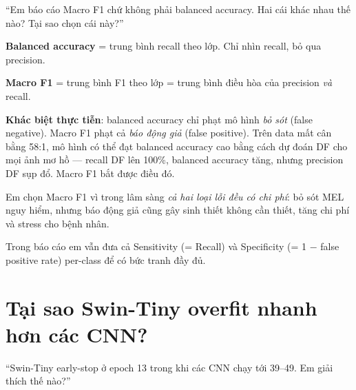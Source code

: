 \documentclass[11pt,a4paper]{article}
\begin{document}
\begin{question}
``Em báo cáo Macro F1 chứ không phải balanced accuracy. Hai cái khác nhau thế nào? Tại sao chọn cái này?''
\end{question}

\begin{answer}
\textbf{Balanced accuracy} = trung bình recall theo lớp. Chỉ nhìn recall, bỏ qua precision.

\textbf{Macro F1} = trung bình F1 theo lớp = trung bình điều hòa của precision \textit{và} recall.

\textbf{Khác biệt thực tiễn}: balanced accuracy chỉ phạt mô hình \textit{bỏ sót} (false negative). Macro F1 phạt cả \textit{báo động giả} (false positive). Trên data mất cân bằng 58:1, mô hình có thể đạt balanced accuracy cao bằng cách dự đoán DF cho mọi ảnh mơ hồ --- recall DF lên 100\%, balanced accuracy tăng, nhưng precision DF sụp đổ. Macro F1 bắt được điều đó.

Em chọn Macro F1 vì trong lâm sàng \textit{cả hai loại lỗi đều có chi phí}: bỏ sót MEL nguy hiểm, nhưng báo động giả cũng gây sinh thiết không cần thiết, tăng chi phí và stress cho bệnh nhân.

Trong báo cáo em vẫn đưa cả Sensitivity (= Recall) và Specificity (= 1 $-$ false positive rate) per-class để có bức tranh đầy đủ.
\end{answer}

\section{Tại sao Swin-Tiny overfit nhanh hơn các CNN?}

\begin{question}
``Swin-Tiny early-stop ở epoch 13 trong khi các CNN chạy tới 39--49. Em giải thích thế nào?''
\end{question}
\end{document}
